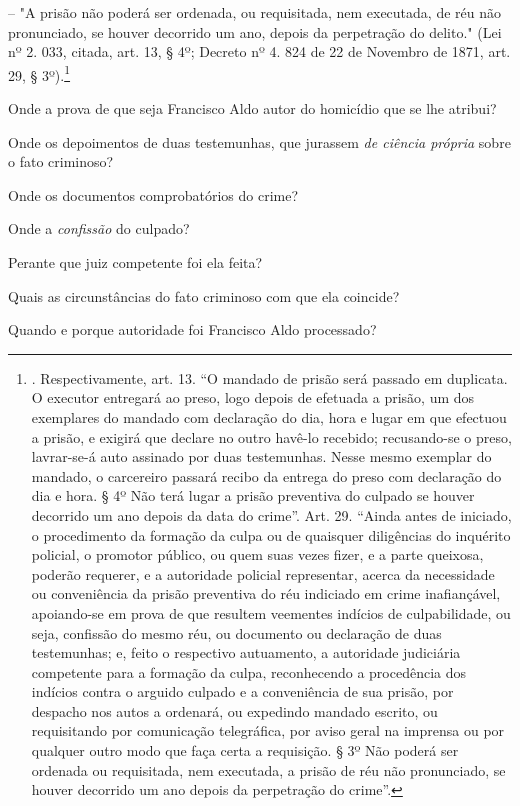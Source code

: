 -- "A prisão não poderá ser ordenada, ou requisitada, nem executada, de
réu não pronunciado, se houver decorrido um ano, depois da perpetração
do delito." (Lei nº 2. 033, citada, art. 13, § 4º; Decreto nº 4. 824 de
22 de Novembro de 1871, art. 29, § 3º).\footnote{. Respectivamente, art.
  13. ``O mandado de prisão será passado em duplicata. O executor
  entregará ao preso, logo depois de efetuada a prisão, um dos
  exemplares do mandado com declaração do dia, hora e lugar em que
  efectuou a prisão, e exigirá que declare no outro havê-lo recebido;
  recusando-se o preso, lavrar-se-á auto assinado por duas testemunhas.
  Nesse mesmo exemplar do mandado, o carcereiro passará recibo da
  entrega do preso com declaração do dia e hora. § 4º Não terá lugar a
  prisão preventiva do culpado se houver decorrido um ano depois da data
  do crime''. Art. 29. ``Ainda antes de iniciado, o procedimento da
  formação da culpa ou de quaisquer diligências do inquérito policial, o
  promotor público, ou quem suas vezes fizer, e a parte queixosa,
  poderão requerer, e a autoridade policial representar, acerca da
  necessidade ou conveniência da prisão preventiva do réu indiciado em
  crime inafiançável, apoiando-se em prova de que resultem veementes
  indícios de culpabilidade, ou seja, confissão do mesmo réu, ou
  documento ou declaração de duas testemunhas; e, feito o respectivo
  autuamento, a autoridade judiciária competente para a formação da
  culpa, reconhecendo a procedência dos indícios contra o arguido
  culpado e a conveniência de sua prisão, por despacho nos autos a
  ordenará, ou expedindo mandado escrito, ou requisitando por
  comunicação telegráfica, por aviso geral na imprensa ou por qualquer
  outro modo que faça certa a requisição. § 3º Não poderá ser ordenada
  ou requisitada, nem executada, a prisão de réu não pronunciado, se
  houver decorrido um ano depois da perpetração do crime''.}

Onde a prova de que seja Francisco Aldo autor do homicídio que se lhe
atribui?

Onde os depoimentos de duas testemunhas, que jurassem \emph{de ciência
própria} sobre o fato criminoso?

Onde os documentos comprobatórios do crime?

Onde a \emph{confissão} do culpado?

Perante que juiz competente foi ela feita?

Quais as circunstâncias do fato criminoso com que ela coincide?

Quando e porque autoridade foi Francisco Aldo processado?

